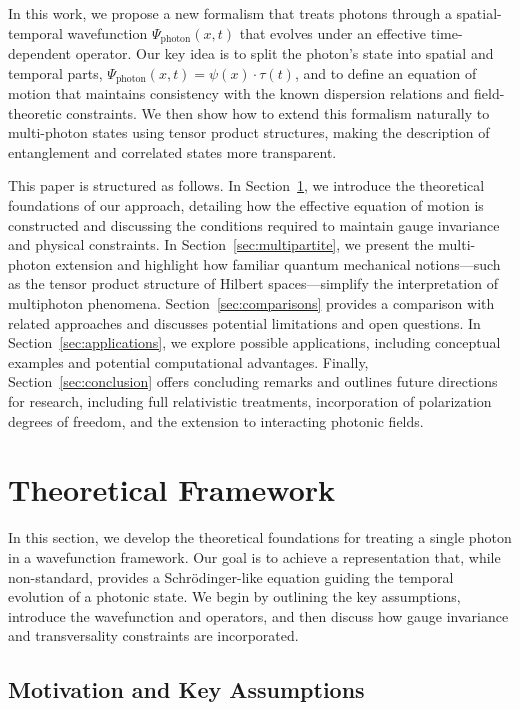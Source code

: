 \documentclass[aps,prl,twocolumn,showpacs,showkeys,superscriptaddress,amsmath,amssymb]{revtex4-2}
\begin{document}
In this work, we propose a new formalism that treats photons through a spatial-temporal wavefunction $\Psi_{\text{photon}}(x,t)$ that evolves under an effective time-dependent operator. Our key idea is to split the photon's state into spatial and temporal parts, $\Psi_{\text{photon}}(x,t)=\psi(x)\cdot\tau(t)$, and to define an equation of motion that maintains consistency with the known dispersion relations and field-theoretic constraints. We then show how to extend this formalism naturally to multi-photon states using tensor product structures, making the description of entanglement and correlated states more transparent.

This paper is structured as follows. In Section~\ref{sec:theory}, we introduce the theoretical foundations of our approach, detailing how the effective equation of motion is constructed and discussing the conditions required to maintain gauge invariance and physical constraints. In Section~\ref{sec:multipartite}, we present the multi-photon extension and highlight how familiar quantum mechanical notions—such as the tensor product structure of Hilbert spaces—simplify the interpretation of multiphoton phenomena. Section~\ref{sec:comparisons} provides a comparison with related approaches and discusses potential limitations and open questions. In Section~\ref{sec:applications}, we explore possible applications, including conceptual examples and potential computational advantages. Finally, Section~\ref{sec:conclusion} offers concluding remarks and outlines future directions for research, including full relativistic treatments, incorporation of polarization degrees of freedom, and the extension to interacting photonic fields.


\section{Theoretical Framework}
\label{sec:theory}

In this section, we develop the theoretical foundations for treating a single photon in a wavefunction framework. Our goal is to achieve a representation that, while non-standard, provides a Schr\"odinger-like equation guiding the temporal evolution of a photonic state. We begin by outlining the key assumptions, introduce the wavefunction and operators, and then discuss how gauge invariance and transversality constraints are incorporated.

\subsection{Motivation and Key Assumptions}
\end{document}

